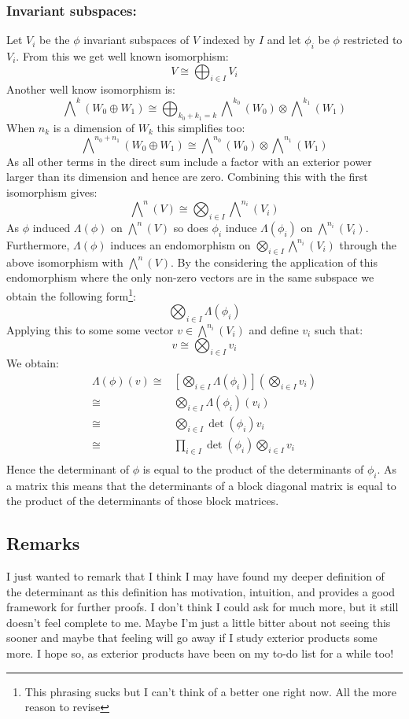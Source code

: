 \subsubsection{Invariant subspaces:}
Let $V_i$ be the $\phi$ invariant subspaces of $V$ indexed by $I$ and let $\phi_i$ be $\phi$ restricted to $V_i$.
From this we get well known isomorphism:
\[V \cong \bigoplus_{i\in I} V_i\]
Another well know isomorphism is:
\[\bigwedge\nolimits^k(W_0\oplus W_1) \cong \bigoplus_{k_0+k_1=k}\bigwedge\nolimits^{k_0}(W_0)\otimes\bigwedge\nolimits^{k_1}(W_1)\]
When $n_k$ is a dimension of $W_k$ this simplifies too:
\[\bigwedge\nolimits^{n_0+n_1}(W_0\oplus W_1) \cong \bigwedge\nolimits^{n_0}(W_0)\otimes\bigwedge\nolimits^{n_1}(W_1)\]
As all other terms in the direct sum include a factor with an exterior power larger than its dimension and hence are zero.
Combining this with the first isomorphism gives:
\[\bigwedge\nolimits^n(V) \cong \bigotimes_{i\in I}\bigwedge\nolimits^{n_i}(V_i)\]
As $\phi$ induced $\Lambda(\phi)$ on $\bigwedge\nolimits^n(V)$ so does $\phi_i$ induce $\Lambda(\phi_i)$ on $\bigwedge\nolimits^{n_i}(V_i)$.
Furthermore,
$\Lambda(\phi)$ induces an endomorphism on $\bigotimes_{i\in I}\bigwedge\nolimits^{n_i}(V_i)$ through the above isomorphism with $\bigwedge\nolimits^{n}(V)$.
By the considering the application of this endomorphism where the only non-zero vectors are in the same subspace we obtain the following form\footnote{This phrasing sucks but I can't think of a better one right now.
All the more reason to revise}:
\[\bigotimes_{i\in I}\Lambda(\phi_i)\]
Applying this to some some vector $v\in \bigwedge\nolimits^{n_i}(V_i)$ and define $v_i$ such that:
\[v \cong \bigotimes_{i\in I}v_i\]
We obtain:
\[\begin{aligned} 
	\Lambda(\phi)(v) \cong& \left[\bigotimes_{i\in I}\Lambda(\phi_i)\right]\left(\bigotimes_{i\in I}v_i\right)\\
	\cong& \bigotimes_{i\in I}\Lambda(\phi_i)(v_i)\\
	\cong& \bigotimes_{i\in I}\det(\phi_i)v_i\\
	\cong& \prod_{i\in I}\det(\phi_i)\bigotimes_{i\in I}v_i\\
\end{aligned}\]
Hence the determinant of $\phi$ is equal to the product of the determinants of $\phi_i$.
As a matrix this means that the determinants of a block diagonal matrix is equal to the product of the determinants of those block matrices.

\subsection{Remarks}
I just wanted to remark that I think I may have found my deeper definition of the determinant as this definition has motivation, intuition, and provides a good framework for further proofs.
I don't think I could ask for much more,
but it still doesn't feel complete to me.
Maybe I'm just a little bitter about not seeing this sooner and maybe that feeling will go away if I study exterior products some more.
I hope so, 
as exterior products have been on my to-do list for a while too!
